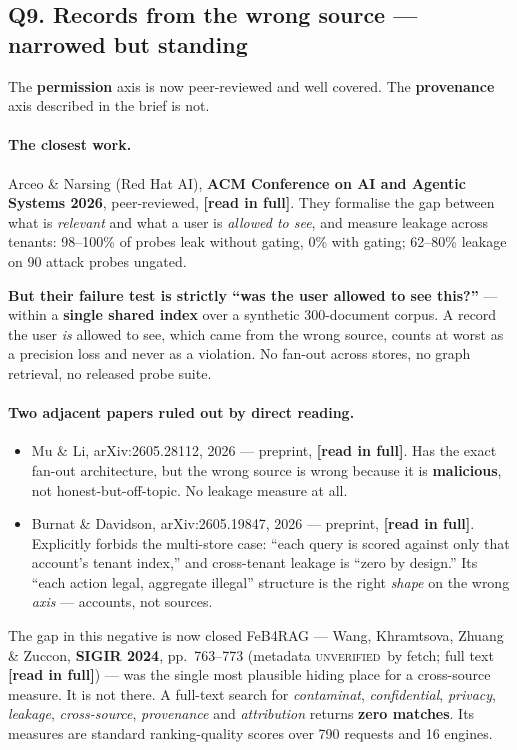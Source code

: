 \documentclass[11pt,a4paper]{article}
\newcommand{\vstanding}{\textcolor{standing}{\textbf{narrowed but standing}}}
\newcommand{\readtag}{\textcolor{standing}{\textbf{[read in full]}}}
\newcommand{\unver}{\textcolor{killed}{\textsc{unverified}}}
\begin{document}
\subsection{Q9. Records from the wrong source --- \texorpdfstring{\vstanding}{narrowed but standing}}

The \textbf{permission} axis is now peer-reviewed and well covered. The
\textbf{provenance} axis described in the brief is not.

\paragraph{The closest work.} Arceo \& Narsing (Red Hat AI), \textbf{ACM Conference
on AI and Agentic Systems 2026}, peer-reviewed, \readtag. They formalise the gap
between what is \emph{relevant} and what a user is \emph{allowed to see}, and
measure leakage across tenants: 98--100\% of probes leak without gating, 0\% with
gating; 62--80\% leakage on 90 attack probes ungated.

\textbf{But their failure test is strictly ``was the user allowed to see this?''}
--- within a \textbf{single shared index} over a synthetic 300-document corpus. A
record the user \emph{is} allowed to see, which came from the wrong source, counts
at worst as a precision loss and never as a violation. No fan-out across stores, no
graph retrieval, no released probe suite.

\paragraph{Two adjacent papers ruled out by direct reading.}

\begin{itemize}
\item Mu \& Li, arXiv:2605.28112, 2026 --- preprint, \readtag. Has the exact fan-out
      architecture, but the wrong source is wrong because it is \textbf{malicious},
      not honest-but-off-topic. No leakage measure at all.
\item Burnat \& Davidson, arXiv:2605.19847, 2026 --- preprint, \readtag. Explicitly
      forbids the multi-store case: ``each query is scored against only that
      account's tenant index,'' and cross-tenant leakage is ``zero by design.'' Its
      ``each action legal, aggregate illegal'' structure is the right \emph{shape} on
      the wrong \emph{axis} --- accounts, not sources.
\end{itemize}

\begin{keybox}{The gap in this negative is now closed}
FeB4RAG --- Wang, Khramtsova, Zhuang \& Zuccon, \textbf{SIGIR 2024}, pp.~763--773
(metadata \unver\ by fetch; full text \readtag) --- was the single most plausible
hiding place for a cross-source measure. It is not there. A full-text search for
\emph{contaminat}, \emph{confidential}, \emph{privacy}, \emph{leakage},
\emph{cross-source}, \emph{provenance} and \emph{attribution} returns
\textbf{zero matches}. Its measures are standard ranking-quality scores over 790
requests and 16 engines.
\end{keybox}
\end{document}
